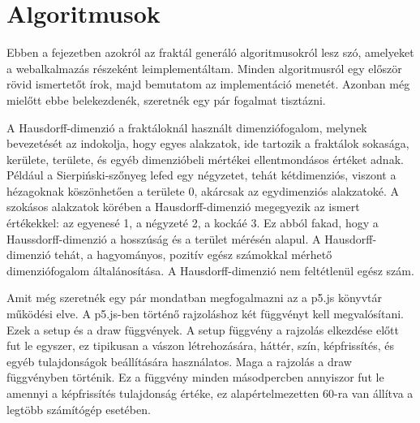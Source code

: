\chapter*{Algoritmusok}
Ebben a fejezetben azokról az fraktál generáló algoritmusokról lesz szó, amelyeket a webalkalmazás részeként leimplementáltam. Minden algoritmusról egy először rövid ismertetőt írok, majd bemutatom az implementáció menetét. Azonban még mielőtt ebbe belekezdenék, szeretnék egy pár fogalmat tisztázni.
\par A Hausdorff-dimenzió a fraktáloknál használt dimenziófogalom, melynek bevezetését az indokolja, hogy egyes alakzatok, ide tartozik a fraktálok sokasága, kerülete, területe, és egyéb dimenzióbeli mértékei ellentmondásos értéket adnak. Például a Sierpiński-szőnyeg lefed egy négyzetet, tehát kétdimenziós, viszont a hézagoknak köszönhetően a területe 0, akárcsak az egydimenziós alakzatoké. A szokásos alakzatok körében a Hausdorff-dimenzió megegyezik az ismert értékekkel: az egyenesé 1, a négyzeté 2, a kockáé 3. Ez abból fakad, hogy a Haussdorff-dimenzió a hosszúság és a terület mérésén alapul. A Hausdorff-dimenzió tehát, a hagyományos, pozitív egész számokkal mérhető dimenziófogalom általánosítása. A Hausdorff-dimenzió nem feltétlenül egész szám.
\par Amit még szeretnék egy pár mondatban megfogalmazni az a p5.js könyvtár működési elve. A p5.js-ben történő rajzoláshoz két függvényt kell megvalósítani. Ezek a setup és a draw függvények. A setup függvény a rajzolás elkezdése előtt fut le egyszer, ez tipikusan a vászon létrehozására, háttér, szín, képfrissítés, és egyéb tulajdonságok beállítására használatos. Maga a rajzolás a draw függvényben történik. Ez a függvény minden másodpercben annyiszor fut le amennyi a képfrissítés tulajdonság értéke, ez alapértelmezetten 60-ra van állítva a legtöbb számítógép esetében. 
